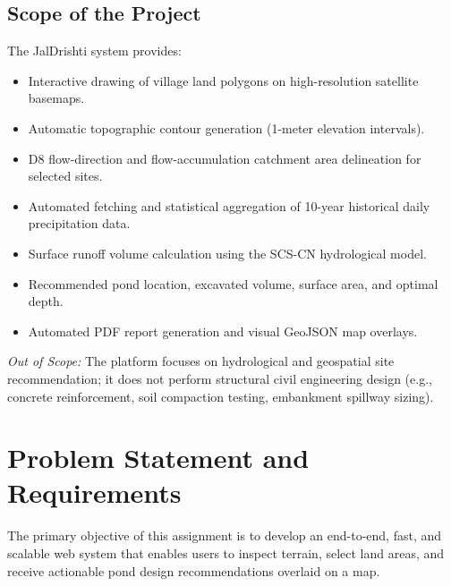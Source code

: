 \documentclass[11pt,a4paper]{article}
\begin{document}
\subsection{Scope of the Project}
The JalDrishti system provides:
\begin{itemize}
    \item Interactive drawing of village land polygons on high-resolution satellite basemaps.
    \item Automatic topographic contour generation (1-meter elevation intervals).
    \item D8 flow-direction and flow-accumulation catchment area delineation for selected sites.
    \item Automated fetching and statistical aggregation of 10-year historical daily precipitation data.
    \item Surface runoff volume calculation using the SCS-CN hydrological model.
    \item Recommended pond location, excavated volume, surface area, and optimal depth.
    \item Automated PDF report generation and visual GeoJSON map overlays.
\end{itemize}
\textit{Out of Scope:} The platform focuses on hydrological and geospatial site recommendation; it does not perform structural civil engineering design (e.g., concrete reinforcement, soil compaction testing, embankment spillway sizing).

\section{Problem Statement and Requirements}
\label{sec:requirements}
The primary objective of this assignment is to develop an end-to-end, fast, and scalable web system that enables users to inspect terrain, select land areas, and receive actionable pond design recommendations overlaid on a map.
\end{document}
